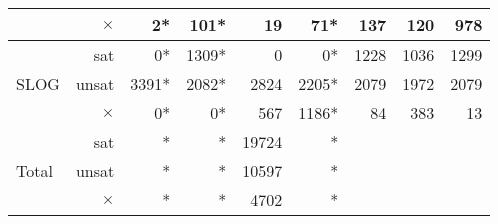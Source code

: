 {\begin{table}[h]
{\begin{tabular}{|l r | r r r r r r r|}
							& $\times$ &     2*   &   101* &    19 &     71*  & 137 & 120 & 978 \\ \hline
\multirow{3}{*}{SLOG}  		& sat      & 0* & 1309* & 0 & 0* & 1228 & 1036 & 1299 \\
							& unsat    & 3391* & 2082* & 2824 & 2205* & 2079 & 1972 & 2079 \\
							& $\times$ & 0* & 0* & 567 & 1186* & 84 & 383 & 13 \\ \hline \hline
\multirow{3}{*}{Total} 		& sat      & * & * & 19724 & * &  &  &  \\
							& unsat    & * & * & 10597 & * &  &  &  \\
							& $\times$ & * & * &  4702 & * &  &  &  \\\hline
\end{tabular}}
\label{table:base_benchmark}
\end{table}
}


